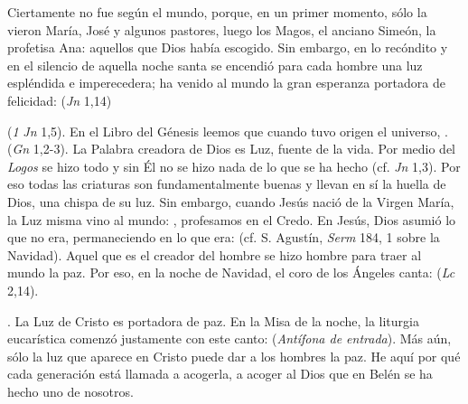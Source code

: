 \begin{body}
\begin{body}
Ciertamente no fue  según el mundo, porque, en un primer momento, sólo la vieron María, José y algunos pastores, luego los Magos, el anciano Simeón, la profetisa Ana: aquellos que Dios había escogido. Sin embargo, en lo recóndito y en el silencio de aquella noche santa se encendió para cada hombre una luz espléndida e imperecedera; ha venido al mundo la gran esperanza portadora de felicidad:  (\emph{Jn} 1,14)

 (\emph{1} \emph{Jn} 1,5). En el Libro del Génesis leemos que cuando tuvo origen el universo, .  (\emph{Gn} 1,2-3). La Palabra creadora de Dios es Luz, fuente de la vida. Por medio del \emph{Logos} se hizo todo y sin Él no se hizo nada de lo que se ha hecho (cf. \emph{Jn} 1,3). Por eso todas las criaturas son fundamentalmente buenas y llevan en sí la huella de Dios, una chispa de su luz. Sin embargo, cuando Jesús nació de la Virgen María, la Luz misma vino al mundo: , profesamos en el Credo. En Jesús, Dios asumió lo que no era, permaneciendo en lo que era:  (cf. S. Agustín, \emph{Serm} 184, 1 sobre la Navidad). Aquel que es el creador del hombre se hizo hombre para traer al mundo la paz. Por eso, en la noche de Navidad, el coro de los Ángeles canta:  (\emph{Lc} 2,14).

\emph{}. La Luz de Cristo es portadora de paz. En la Misa de la noche, la liturgia eucarística comenzó justamente con este canto:  (\emph{Antífona de entrada}). Más aún, sólo la  luz que aparece en Cristo puede dar a los hombres la  paz. He aquí por qué cada generación está llamada a acogerla, a acoger al Dios que en Belén se ha hecho uno de nosotros.


\end{body}
\end{body}
